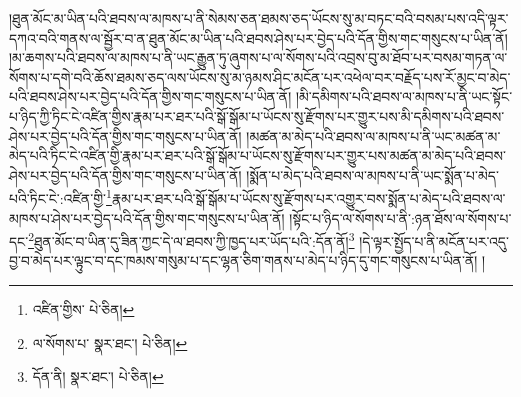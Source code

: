 །ཐུན་མོང་མ་ཡིན་པའི་ཐབས་ལ་མཁས་པ་ནི་སེམས་ཅན་ཐམས་ཅད་ཡོངས་སུ་མ་བཏང་བའི་བསམ་པས་འདི་ལྟར་དཀའ་བའི་གནས་ལ་སྦྱོར་བ་ན་ཐུན་མོང་མ་ཡིན་པའི་ཐབས་ཤེས་པར་བྱེད་པའི་དོན་གྱིས་གང་གསུངས་པ་ཡིན་ནོ། །མ་ཆགས་པའི་ཐབས་ལ་མཁས་པ་ནི་ཡང་རྒྱུན་ཏུ་ཞུགས་པ་ལ་སོགས་པའི་འབྲས་བུ་མ་ཐོབ་པར་བསམ་གཏན་ལ་སོགས་པ་དགེ་བའི་ཆོས་ཐམས་ཅད་ལས་ཡོངས་སུ་མ་ཉམས་ཤིང་མངོན་པར་འཕེལ་བར་བརྗོད་པས་རོ་མྱང་བ་མེད་པའི་ཐབས་ཤེས་པར་བྱེད་པའི་དོན་གྱིས་གང་གསུངས་པ་ཡིན་ནོ། །མི་དམིགས་པའི་ཐབས་ལ་མཁས་པ་ནི་ཡང་སྟོང་པ་ཉིད་ཀྱི་ཏིང་ངེ་འཛིན་གྱིས་རྣམ་པར་ཐར་པའི་སྒོ་སྒོམ་པ་ཡོངས་སུ་རྫོགས་པར་གྱུར་པས་མི་དམིགས་པའི་ཐབས་ཤེས་པར་བྱེད་པའི་དོན་གྱིས་གང་གསུངས་པ་ཡིན་ནོ། །མཚན་མ་མེད་པའི་ཐབས་ལ་མཁས་པ་ནི་ཡང་མཚན་མ་མེད་པའི་ཏིང་ངེ་འཛིན་གྱི་རྣམ་པར་ཐར་པའི་སྒོ་སྒོམ་པ་ཡོངས་སུ་རྫོགས་པར་གྱུར་པས་མཚན་མ་མེད་པའི་ཐབས་ཤེས་པར་བྱེད་པའི་དོན་གྱིས་གང་གསུངས་པ་ཡིན་ནོ། །སྨོན་པ་མེད་པའི་ཐབས་ལ་མཁས་པ་ནི་ཡང་སྨོན་པ་མེད་པའི་ཏིང་ངེ་:འཛིན་གྱི་\footnote{འཛིན་གྱིས་  པེ་ཅིན། }རྣམ་པར་ཐར་པའི་སྒོ་སྒོམ་པ་ཡོངས་སུ་རྫོགས་པར་འགྱུར་བས་སྨོན་པ་མེད་པའི་ཐབས་ལ་མཁས་པ་ཤེས་པར་བྱེད་པའི་དོན་གྱིས་གང་གསུངས་པ་ཡིན་ནོ། །སྟོང་པ་ཉིད་ལ་སོགས་པ་ནི་:ཉན་ཐོས་ལ་སོགས་པ་དང་\footnote{ལ་སོགས་པ་  སྣར་ཐང་།  པེ་ཅིན། }ཐུན་མོང་བ་ཡིན་དུ་ཟིན་ཀྱང་དེ་ལ་ཐབས་ཀྱི་ཁྱད་པར་ཡོད་པའི་:དོན་ནོ།\footnote{དོན་ནི།  སྣར་ཐང་།  པེ་ཅིན། } །དེ་ལྟར་སྤྱོད་པ་ནི་མངོན་པར་འདུ་བྱ་བ་མེད་པར་ལྟུང་བ་དང་ཁམས་གསུམ་པ་དང་ལྷན་ཅིག་གནས་པ་མེད་པ་ཉིད་དུ་གང་གསུངས་པ་ཡིན་ནོ། །
